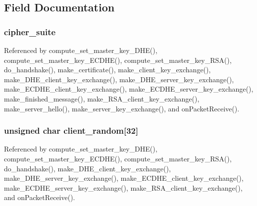 \subsection{Field Documentation}
\subsubsection[{\texorpdfstring{cipher\+\_\+suite}{cipher_suite}}]{ cipher\+\_\+suite}\hypertarget{struct_t_l_s__parameters__t_af1d8ebe57a775be2b91550dbcacb2a58}{}\label{struct_t_l_s__parameters__t_af1d8ebe57a775be2b91550dbcacb2a58}


Referenced by compute\+\_\+set\+\_\+master\+\_\+key\+\_\+\+D\+H\+E(), compute\+\_\+set\+\_\+master\+\_\+key\+\_\+\+E\+C\+D\+H\+E(), compute\+\_\+set\+\_\+master\+\_\+key\+\_\+\+R\+S\+A(), do\+\_\+handshake(), make\+\_\+certificate(), make\+\_\+client\+\_\+key\+\_\+exchange(), make\+\_\+\+D\+H\+E\+\_\+client\+\_\+key\+\_\+exchange(), make\+\_\+\+D\+H\+E\+\_\+server\+\_\+key\+\_\+exchange(), make\+\_\+\+E\+C\+D\+H\+E\+\_\+client\+\_\+key\+\_\+exchange(), make\+\_\+\+E\+C\+D\+H\+E\+\_\+server\+\_\+key\+\_\+exchange(), make\+\_\+finished\+\_\+message(), make\+\_\+\+R\+S\+A\+\_\+client\+\_\+key\+\_\+exchange(), make\+\_\+server\+\_\+hello(), make\+\_\+server\+\_\+key\+\_\+exchange(), and on\+Packet\+Receive().

\subsubsection[{\texorpdfstring{client\+\_\+random}{client_random}}]{\setlength{\rightskip}{0pt plus 5cm}unsigned char client\+\_\+random\mbox{[}32\mbox{]}}\hypertarget{struct_t_l_s__parameters__t_adbdca8d573a8e073ef16bf14229fb4c9}{}\label{struct_t_l_s__parameters__t_adbdca8d573a8e073ef16bf14229fb4c9}


Referenced by compute\+\_\+set\+\_\+master\+\_\+key\+\_\+\+D\+H\+E(), compute\+\_\+set\+\_\+master\+\_\+key\+\_\+\+E\+C\+D\+H\+E(), compute\+\_\+set\+\_\+master\+\_\+key\+\_\+\+R\+S\+A(), do\+\_\+handshake(), make\+\_\+\+D\+H\+E\+\_\+client\+\_\+key\+\_\+exchange(), make\+\_\+\+D\+H\+E\+\_\+server\+\_\+key\+\_\+exchange(), make\+\_\+\+E\+C\+D\+H\+E\+\_\+client\+\_\+key\+\_\+exchange(), make\+\_\+\+E\+C\+D\+H\+E\+\_\+server\+\_\+key\+\_\+exchange(), make\+\_\+\+R\+S\+A\+\_\+client\+\_\+key\+\_\+exchange(), and on\+Packet\+Receive().

